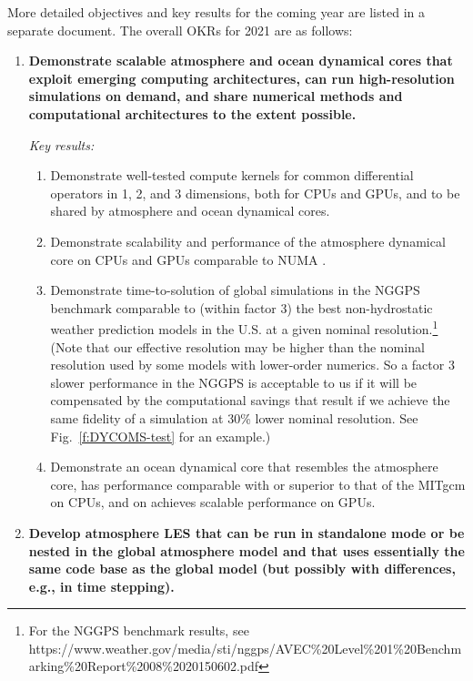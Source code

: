 \documentclass{article}
\begin{document}
More detailed objectives and key results for the coming year are listed in a separate document. The overall OKRs for 2021 are as follows:    
\begin{enumerate}
    \item \textbf{Demonstrate scalable atmosphere and ocean dynamical cores that exploit emerging computing architectures, can run high-resolution simulations on demand, and share numerical methods and computational architectures to the extent possible.}
        
    \emph{Key results:}
    \begin{enumerate}
        \item Demonstrate well-tested compute kernels for common differential operators in 1, 2, and 3 dimensions, both for CPUs and GPUs, and to be shared by atmosphere and ocean dynamical cores.
        \item Demonstrate scalability and performance of the atmosphere dynamical core on CPUs and GPUs comparable to NUMA \citep{abdi:2016b,abdi:2018,mueller:2016}. 
        \item Demonstrate time-to-solution of global simulations in the  NGGPS benchmark comparable to (within factor 3) the best non-hydrostatic weather prediction models in the U.S. at a given nominal resolution.\footnote{For the NGGPS benchmark results, see https://www.weather.gov/media/sti/nggps/AVEC\%20Level\%201\%20Benchmarking\%20Report\%2008\%2020150602.pdf} (Note that our effective resolution may be higher than the nominal resolution used by some models with lower-order numerics. So a factor 3 slower performance in the NGGPS is acceptable to us if it will be compensated by the computational savings that result if we achieve the same fidelity of a simulation at 30\% lower nominal resolution. See Fig.~\ref{f:DYCOMS-test} for an example.)
        \item Demonstrate an ocean dynamical core that resembles the atmosphere core, has performance comparable with or superior to that of the MITgcm on CPUs, and on achieves scalable performance on GPUs. 
    \end{enumerate}
 
 \item \textbf{Develop atmosphere LES that can be run in standalone mode or be nested in the global atmosphere model and that uses essentially the same code base as the global model (but possibly with differences, e.g., in time stepping).}
 

\end{enumerate}
\end{document}
